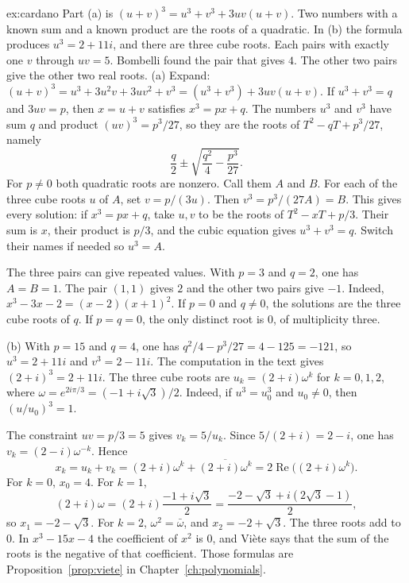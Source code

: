 \begin{solution}{ex:cardano}
\idea Part (a) is $(u+v)^3=u^3+v^3+3uv(u+v)$. Two numbers with a known sum and a known product are the roots of a quadratic. In (b) the formula produces $u^3=2+11i$, and there are three cube roots. Each pairs with exactly one $v$ through $uv=5$. Bombelli found the pair that gives $4$. The other two pairs give the other two real roots.
\writeup (a) Expand: $(u+v)^3=u^3+3u^2v+3uv^2+v^3=(u^3+v^3)+3uv(u+v)$. If $u^3+v^3=q$ and $3uv=p$, then $x=u+v$ satisfies $x^3=px+q$. The numbers $u^3$ and $v^3$ have sum $q$ and product $(uv)^3=p^3/27$, so they are the roots of $T^2-qT+p^3/27$, namely
\[
\frac q2\pm\sqrt{\frac{q^2}4-\frac{p^3}{27}}.
\]
For $p\ne0$ both quadratic roots are nonzero. Call them $A$ and $B$. For each of the three cube roots $u$ of $A$, set $v=p/(3u)$. Then $v^3=p^3/(27A)=B$. This gives every solution: if $x^3=px+q$, take $u,v$ to be the roots of $T^2-xT+p/3$. Their sum is $x$, their product is $p/3$, and the cubic equation gives $u^3+v^3=q$. Switch their names if needed so $u^3=A$.

The three pairs can give repeated values. With $p=3$ and $q=2$, one has $A=B=1$. The pair $(1,1)$ gives $2$ and the other two pairs give $-1$. Indeed, $x^3-3x-2=(x-2)(x+1)^2$. If $p=0$ and $q\ne0$, the solutions are the three cube roots of $q$. If $p=q=0$, the only distinct root is $0$, of multiplicity three.

(b) With $p=15$ and $q=4$, one has $q^2/4-p^3/27=4-125=-121$, so $u^3=2+11i$ and $v^3=2-11i$. The computation in the text gives $(2+i)^3=2+11i$. The three cube roots are $u_k=(2+i)\omega^k$ for $k=0,1,2$, where $\omega=e^{2i\pi/3}=(-1+i\sqrt3)/2$. Indeed, if $u^3=u_0^3$ and $u_0\ne0$, then $(u/u_0)^3=1$.

The constraint $uv=p/3=5$ gives $v_k=5/u_k$. Since $5/(2+i)=2-i$, one has $v_k=(2-i)\omega^{-k}$. Hence
\[
x_k=u_k+v_k=(2+i)\omega^k+\overline{(2+i)\omega^k}=2\operatorname{Re}\bigl((2+i)\omega^k\bigr).
\]
For $k=0$, $x_0=4$. For $k=1$,
\[
(2+i)\omega=(2+i)\frac{-1+i\sqrt3}2=\frac{-2-\sqrt3+i(2\sqrt3-1)}2,
\]
so $x_1=-2-\sqrt3$. For $k=2$, $\omega^2=\bar\omega$, and $x_2=-2+\sqrt3$. The three roots add to $0$. In $x^3-15x-4$ the coefficient of $x^2$ is $0$, and Vi\`ete says that the sum of the roots is the negative of that coefficient. Those formulas are Proposition~\ref{prop:viete} in Chapter~\ref{ch:polynomials}.
\end{solution}


